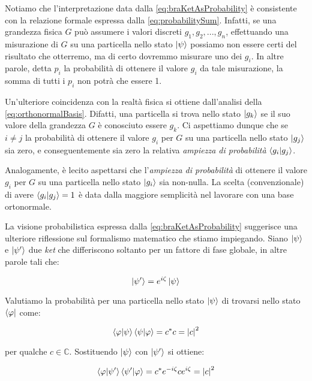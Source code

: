 Notiamo che l'interpretazione data dalla \eqref{eq:braKetAsProbability} \`e consistente con la relazione formale espressa dalla \eqref{eq:probabilitySum}. Infatti, se una grandezza fisica $G$ può assumere i valori discreti $g_1, g_2, ..., g_n$, effettuando una misurazione di $G$ su una particella nello stato $\ket{\psi}$ possiamo non essere certi del risultato che otterremo, ma di certo dovremmo misurare uno dei $g_i$. In altre parole, detta $p_i$ la probabilità di ottenere il valore $g_i$ da tale misurazione, la somma di tutti i $p_i$ non potrà che essere 1.

Un'ulteriore coincidenza con la realtà fisica si ottiene dall'analisi della \eqref{eq:orthonormalBasis}. Difatti, una particella si trova nello stato $\ket{g_k}$ se il suo valore della grandezza $G$ \`e conosciuto essere $g_k$. Ci aspettiamo dunque che se $i \neq j$ la probabilità di ottenere il valore $g_i$ per $G$ su una particella nello stato $\ket{g_j}$ sia zero, e conseguentemente sia zero la relativa \textit{ampiezza di probabilità} $\braket{g_i}{g_j}$.

Analogamente, \`e lecito aspettarsi che l'\textit{ampiezza di probabilità} di ottenere il valore $g_i$ per $G$ su una particella nello stato $\ket{g_i}$ sia non-nulla. La scelta (convenzionale) di avere $\braket{g_i}{g_j} = 1$ \`e data dalla maggiore semplicità nel lavorare con una base ortonormale.

La visione probabilistica espressa dalla \eqref{eq:braKetAsProbability} suggerisce una ulteriore riflessione sul formalismo matematico che stiamo impiegando. Siano $\ket{\psi}$ e $\ket{\psi ' }$ due \textit{ket} che differiscono soltanto per un fattore di fase globale, in altre parole tali che:

	\begin{equation}
		\ket{\psi '} = e^{i \zeta} \ket{\psi}
	\end{equation}

Valutiamo la probabilit\`a per una particella nello stato $\ket{\psi}$ di trovarsi nello stato $\bra{\varphi}$ come:

	\begin{equation}
		\braket{\varphi}{\psi} \braket{\psi}{\varphi} = c^* c = \left | c \right | ^ 2
	\end{equation}

per qualche $c \in \mathbb{C}$. Sostituendo $\ket{\psi}$ con $\ket{\psi '}$ si ottiene:

	\begin{equation}
		\braket{\varphi}{\psi'} \braket{\psi'}{\varphi} = c^* e^{- i \zeta} c e^{i \zeta} = \left | c \right | ^ 2
	\end{equation}

